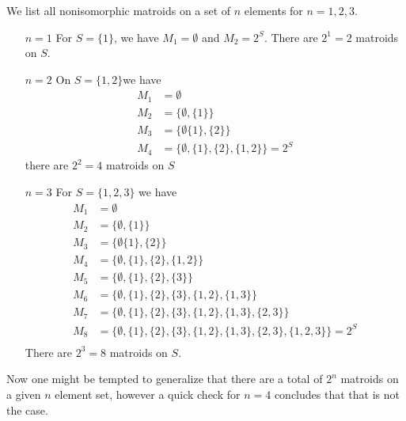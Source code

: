 \begin{example}
    We list all nonisomorphic matroids on a set of $n$ elements for  $n=1,2,3$.		
        \begin{enumerate}
            \item[\underline{$n=1$}] For $S=\{1\}$, we have $ M_1=\emptyset$ and $ M_2=2^S$. There
                are $2^1=2$ matroids on  $S$.

            \item [\underline{$n=2$}] On $S=\{1,2\}$we have
                \begin{align*}
                    M_1 &= \emptyset \\
                    M_2 &= \{\emptyset, \{1\}\} \\
                    M_3 &= \{\emptyset \{1\},\{2\}\} \\
                    M_4 &= \{\emptyset,\{1\},\{2\},\{1,2\}\}=2^S
                \end{align*}
                there are $2^2=4$ matroids on $S$ 

            \item [\underline{$n=3$}] For $S=\{1,2,3\}$ we have
                \begin{align*}
                    M_1 &= \emptyset \\
                    M_2 &= \{\emptyset, \{1\}\} \\
                    M_3 &= \{\emptyset \{1\},\{2\}\} \\
                    M_4 &= \{\emptyset,\{1\},\{2\},\{1,2\}\} \\
                    M_5 &= \{\emptyset, \{1\}, \{2\}, \{3\}\} \\
                    M_6 &= \{\emptyset, \{1\}, \{2\}, \{3\}, \{1,2\}, \{1,3\}\} \\
                    M_7 &= \{\emptyset, \{1\}, \{2\}, \{3\}, \{1,2\}, \{1,3\}, \{2,3\}\} \\
                    M_8 &= \{\emptyset, \{1\}, \{2\}, \{3\}, \{1,2\}, \{1,3\}, \{2,3\},
                    \{1,2,3\}\}=2^S \\
                \end{align*}
                There are $2^3=8$ matroids on  $S$.
        \end{enumerate}

        Now one might be tempted to generalize that there are a total of $2^n$ matroids on a given
        $n$ element set, however a quick check for  $n=4$ concludes that that is not the case.


\end{example}
